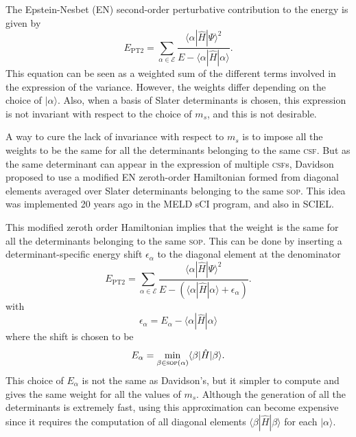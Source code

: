 \documentclass[aip,jcp,reprint,showkeys]{revtex4-1}
\newcommand{\ket}[1]{|#1\rangle}
\newcommand{\sop}{\textsc{sop}}
\newcommand{\csf}{\textsc{csf}}
\newcommand{\mel}[3]{\langle #1 | #2 | #3 \rangle}
\newcommand{\ept}{E_\text{PT2}}
\begin{document}
The Epstein-Nesbet (EN) second-order perturbative contribution to the energy is given
by
\begin{equation}
\ept = \sum_{\alpha \in \mathcal{E}} \frac{\mel{\alpha}{\hat{H}}{\Psi}^2}{E-\mel{\alpha}{\hat{H}}{\alpha}}.
\label{eq:pt2}
\end{equation}
This equation can be seen as a weighted sum of the different terms involved in
the expression of the variance. However, the weights differ depending on the
choice of $\ket{\alpha}$. Also, when a basis of Slater determinants is chosen,
this expression is not invariant with respect to the choice of $m_s$, and this 
is not desirable.

A way to cure the lack of invariance with respect to $m_s$ is to impose all the weights
to be the same for all the determinants belonging to the same \csf . But as 
the same determinant can appear in the expression of multiple \csf s, Davidson
proposed to use a modified EN zeroth-order Hamiltonian formed from
diagonal elements averaged over Slater determinants belonging to the same
\sop . This idea was implemented 20 years ago in the MELD sCI
program,\cite{Davidson_1979,Kozlowski_1994} and also in SCIEL.\cite{Sciel}

This modified zeroth order Hamiltonian implies that the weight is the same for
all the determinants belonging to the same \sop . This can be done by
inserting a determinant-specific energy shift $\epsilon_\alpha$ to the
diagonal element at the denominator 
\begin{equation}
\ept = \sum_{\alpha \in \mathcal{E}} \frac{\mel{\alpha}{\hat{H}}{\Psi}^2}{E-\left(\mel{\alpha}{\hat{H}}{\alpha}+\epsilon_\alpha \right)}.
\end{equation}
with
\begin{equation}
\epsilon_\alpha = E_\alpha - \mel{\alpha}{\hat{H}}{\alpha} 
\end{equation}
where the shift is chosen to be
\begin{equation}
E_\alpha = \min_{\beta \in \text{\sop}(\alpha)} \mel{\beta}{\hat{H}}{\beta}.
\end{equation}
This choice of $E_\alpha$ is not the same as Davidson's, but it simpler to compute
and gives the same weight for all the values of $m_s$.
Although the generation of all the determinants is extremely fast, using
this approximation can become expensive since it requires the computation of
all diagonal elements $\mel{\beta}{\hat{H}}{\beta}$ for each
$\ket{\alpha}$.
\end{document}

